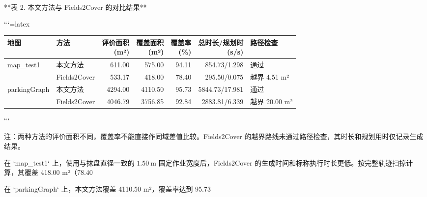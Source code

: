   

**表 2. 本文方法与 Fields2Cover 的对比结果**

```{=latex}
\begin{center}
\footnotesize
\setlength{\tabcolsep}{3pt}
\renewcommand{\arraystretch}{1.18}
\begin{tabular}{@{}p{2.1cm}p{2.0cm}rrrrp{2.7cm}@{}}
\toprule
地图 & 方法 & \shortstack{评价面积\\(m²)} & \shortstack{覆盖面积\\(m²)} & \shortstack{覆盖率\\(\%)} & \shortstack{总时长/规划时\\(s/s)} & 路径检查 \\
\midrule
map\_test1 & 本文方法 & 611.00 & 575.00 & 94.11 & 854.73/1.298 & 通过 \\
 & Fields2Cover & 533.17 & 418.00 & 78.40 & 295.50/0.075 & 越界 4.51 m² \\
parkingGraph & 本文方法 & 4294.00 & 4110.50 & 95.73 & 5844.73/17.981 & 通过 \\
 & Fields2Cover & 4046.79 & 3756.85 & 92.84 & 2883.81/6.339 & 越界 20.00 m² \\
\bottomrule
\end{tabular}
\end{center}
```

注：两种方法的评价面积不同，覆盖率不能直接作同域差值比较。Fields2Cover 的越界路线未通过路径检查，其时长和规划用时仅记录生成结果。

  

在 `map_test1` 上，使用与抹盘直径一致的 $1.50\ \mathrm{m}$ 固定作业宽度后，Fields2Cover 的生成时间和标称执行时长更低。按完整轨迹扫掠计算，其覆盖 418.00 m²（78.40%

  

在 `parkingGraph` 上，本文方法覆盖 4110.50 m²，覆盖率达到 95.73%

